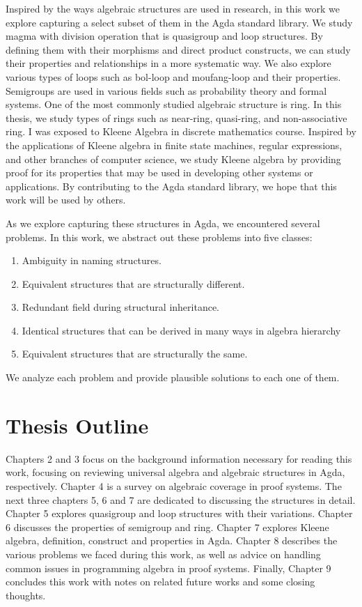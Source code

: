 Inspired by the ways algebraic structures are used in research, in this work we
explore capturing a select subset of them in the Agda standard library. We study
magma with division operation that is quasigroup and loop structures. By
defining them with their morphisms and direct product constructs, we can study
their properties and relationships in a more systematic way. We also explore
various types of loops such as bol-loop and moufang-loop and their properties.
Semigroups are used in various fields such as probability theory and formal
systems. One of the most commonly studied algebraic structure is ring. In this
thesis, we study types of rings such as near-ring, quasi-ring, and
non-associative ring. I was exposed to Kleene Algebra in discrete mathematics
course. Inspired by the applications of Kleene algebra in finite state machines,
regular expressions, and other branches of computer science, we study Kleene
algebra by providing proof for its properties that may be used in developing
other systems or applications. By contributing to the Agda standard library, we hope
that this work will be used by others. 

As we explore capturing these structures in Agda, we encountered several
problems. In this work, we abstract out these problems into five classes:
\begin{enumerate}
\item Ambiguity in naming structures.
\item Equivalent structures that are structurally different.
\item Redundant field during structural inheritance.
\item Identical structures that can be derived in many ways in algebra hierarchy
\item Equivalent structures that are structurally the same.
\end{enumerate}
We analyze each problem and provide plausible solutions to each one of them.

\section{Thesis Outline}
Chapters 2 and 3 focus on the background information necessary for reading this
work, focusing on reviewing universal algebra and algebraic structures in Agda,
respectively. Chapter 4 is a survey on algebraic coverage in proof systems. The
next three chapters 5, 6 and 7 are dedicated to discussing the structures in
detail. Chapter 5 explores quasigroup and loop structures with their variations.
Chapter 6 discusses the properties of semigroup and ring. Chapter 7 explores
Kleene algebra, definition, construct and properties in Agda. Chapter 8
describes the various problems we faced during this work, as well as advice on
handling common issues in programming algebra in proof systems. Finally,
Chapter 9 concludes this work with notes on related future works and some
closing thoughts.
